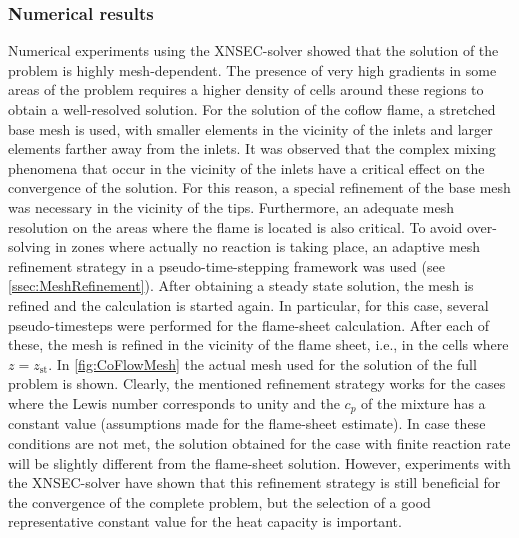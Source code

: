 \subsubsection{Numerical results}
Numerical experiments using the XNSEC-solver showed that the solution of the problem is highly mesh-dependent. The presence of very high gradients in some areas of the problem requires a higher density of cells around these regions to obtain a well-resolved solution. For the solution of the coflow flame, a stretched base mesh is used, with smaller elements in the vicinity of the inlets and larger elements farther away from the inlets. It was observed that the complex mixing phenomena that occur in the vicinity of the inlets have a critical effect on the convergence of the solution. For this reason, a special refinement of the base mesh was necessary in the vicinity of the tips. 
Furthermore, an adequate mesh resolution on the areas where the flame is located is also critical. To avoid over-solving in zones where actually no reaction is taking place, an adaptive mesh refinement strategy in a pseudo-time-stepping framework was used (see \cref{ssec:MeshRefinement}). After obtaining a steady state solution, the mesh is refined and the calculation is started again. In particular, for this case, several pseudo-timesteps were performed for the flame-sheet calculation. After each of these, the mesh is refined in the vicinity of the flame sheet, i.e., in the cells where $z = z_{\text{st}}$. In \cref{fig:CoFlowMesh} the actual mesh used for the solution of the full problem is shown. Clearly, the mentioned refinement strategy works for the cases where the Lewis number corresponds to unity and the $c_p$ of the mixture has a constant value (assumptions made for the flame-sheet estimate). In case these conditions are not met, the solution obtained for the case with finite reaction rate will be slightly different from the flame-sheet solution.  However, experiments with the XNSEC-solver have shown that this refinement strategy is still beneficial for the convergence of the complete problem, but the selection of a good representative constant value for the heat capacity is important. 

